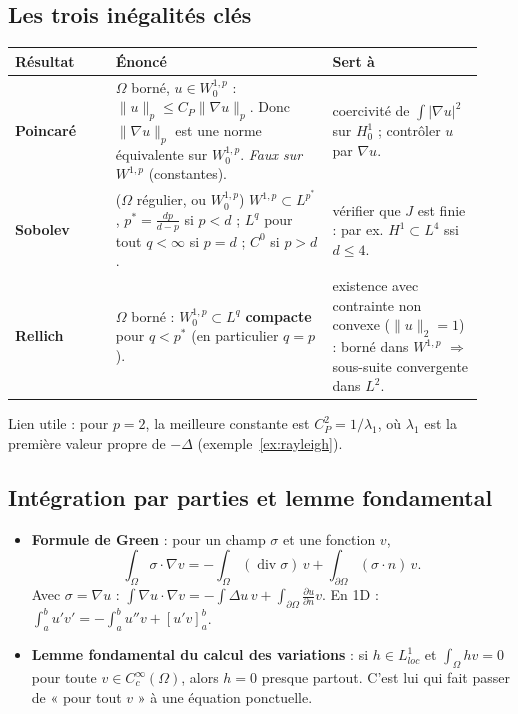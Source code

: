 \documentclass[10pt,a4paper]{article}
\newcommand{\nr}[1]{\|#1\|}
\renewcommand{\div}{\operatorname{div}}
\begin{document}
\subsection{Les trois inégalités clés}
\begin{center}
\renewcommand{\arraystretch}{1.25}
\begin{tabular}{@{}>{\raggedright}p{0.2\linewidth}>{\raggedright}p{0.43\linewidth}>{\raggedright\arraybackslash}p{0.3\linewidth}@{}}
\toprule
\textbf{Résultat} & \textbf{Énoncé} & \textbf{Sert à}\\\midrule
\textbf{Poincaré} & $\Omega$ borné, $u\in W^{1,p}_0$ : $\nr u_p\le C_P\nr{\nabla u}_p$. Donc $\nr{\nabla u}_p$ est une norme équivalente sur $W^{1,p}_0$. \emph{Faux sur $W^{1,p}$} (constantes). & coercivité de $\int|\nabla u|^2$ sur $H^1_0$ ; contrôler $u$ par $\nabla u$.\\
\textbf{Sobolev} & ($\Omega$ régulier, ou $W^{1,p}_0$) $W^{1,p}\subset L^{p^*}$, $p^*=\frac{dp}{d-p}$ si $p<d$ ; $L^q$ pour tout $q<\infty$ si $p=d$ ; $C^0$ si $p>d$. & vérifier que $J$ est finie : par ex. $H^1\subset L^4$ ssi $d\le4$.\\
\textbf{Rellich} & $\Omega$ borné : $W^{1,p}_0\subset L^q$ \textbf{compacte} pour $q<p^*$ (en particulier $q=p$). & existence avec contrainte non convexe ($\nr u_2=1$) : borné dans $W^{1,p}$ $\Rightarrow$ sous-suite convergente dans $L^2$.\\
\bottomrule
\end{tabular}
\end{center}
Lien utile : pour $p=2$, la meilleure constante est $C_P^2=1/\lambda_1$, où $\lambda_1$ est la première valeur propre de $-\Delta$ (exemple~\ref{ex:rayleigh}).

\subsection{Intégration par parties et lemme fondamental}
\begin{itemize}
\item \textbf{Formule de Green} : pour un champ $\sigma$ et une fonction $v$,
\[\int_\Omega\sigma\cdot\nabla v=-\int_\Omega(\div\sigma)\,v+\int_{\partial\Omega}(\sigma\cdot n)\,v .\]
Avec $\sigma=\nabla u$ : $\int\nabla u\cdot\nabla v=-\int\Delta u\,v+\int_{\partial\Omega}\frac{\partial u}{\partial n}v$. En 1D : $\int_a^bu'v'=-\int_a^bu''v+[u'v]_a^b$.
\item \textbf{Lemme fondamental du calcul des variations} : si $h\in L^1_{loc}$ et $\int_\Omega hv=0$ pour toute $v\in C^\infty_c(\Omega)$, alors $h=0$ presque partout. C'est lui qui fait passer de « pour tout $v$ » à une équation ponctuelle.
\end{itemize}
\end{document}
